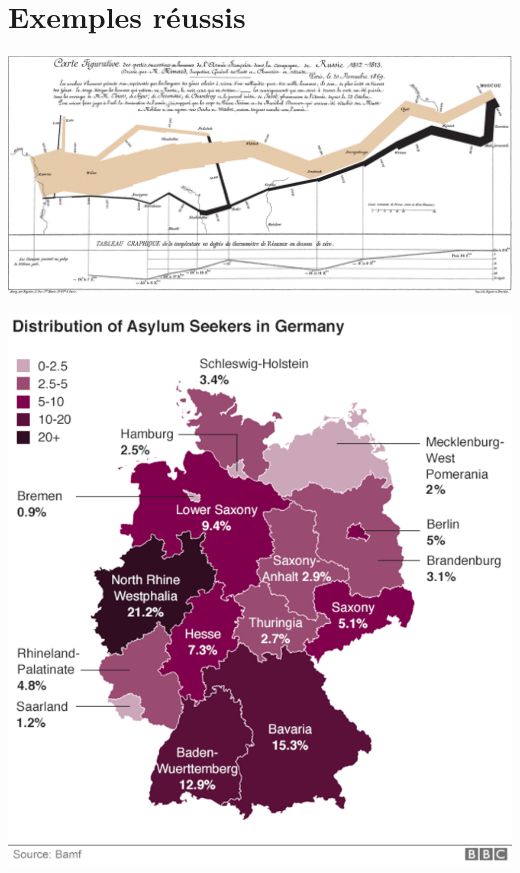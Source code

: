 \documentclass{beamer}
\begin{document}
\section{Exemples réussis}




\begin{frame}
\centering
\includegraphics[width=\textwidth,keepaspectratio]{img/minard.png}
\end{frame}



\begin{frame}
\centering
\includegraphics[width=\textwidth,keepaspectratio]{img/bon_exemple.png}
\end{frame}
\end{document}
